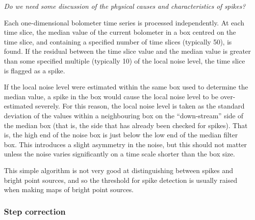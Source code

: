 \documentclass[useAMS,usenatbib,nofootinbib]{mn2e}
\begin{document}
\emph{Do we need some discussion of the physical causes and
characteristics of spikes?}

Each one-dimensional bolometer time series is processed independently. At
each time slice, the median value of the current bolometer in a box
centred on the time slice, and containing a specified number of time
slices (typically 50), is found. If the residual between the
time slice value and the median value is greater than some specified
multiple (typically 10) of the local noise level, the time slice is
flagged as a spike.

If the local noise level were estimated within the same box used to
determine the median value, a spike in the box would cause the local
noise level to be over-estimated severely. For this reason, the local
noise level is taken as the standard deviation of the values within a
neighbouring box on the ``down-stream'' side of the median box (that is,
the side that has already been checked for spikes). That is, the high end
of the noise box is just below the low end of the median filter box. This
introduces a slight asymmetry in the noise, but this should not matter
unless the noise varies significantly on a time scale shorter than the
box size.

This simple algorithm is not very good at distinguishing between spikes
and bright point sources, and so the threshold for spike detection is
usually raised when making maps of bright point sources.

\subsubsection{Step correction}
\label{sec:steps}
\end{document}
